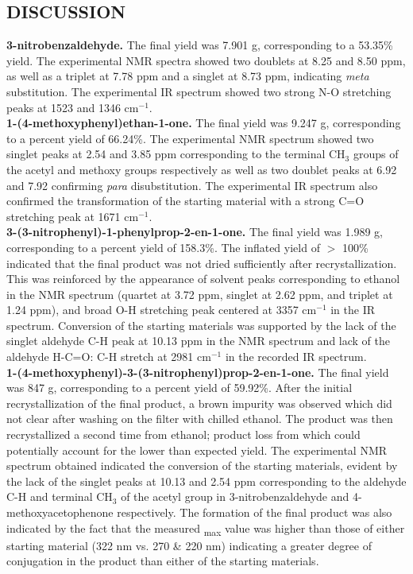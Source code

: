 \documentclass[11pt]{article}
\let\bf\textbf
\begin{document}
\subsection*{DISCUSSION}
\bf{3-nitrobenzaldehyde.} The final yield was 7.901 g, corresponding to a 53.35\% yield. The experimental NMR spectra showed two doublets at 8.25 and 8.50 ppm, as well as a triplet at 7.78 ppm and a singlet at 8.73 ppm, indicating \textit{meta} substitution. The experimental IR spectrum showed two strong N-O stretching peaks at 1523 and 1346 cm$^{-1}$. \vspace{2pt}\\
\bf{1-(4-methoxyphenyl)ethan-1-one.} The final yield was 9.247 g, corresponding to a percent yield of 66.24\%. The experimental NMR spectrum showed two singlet peaks at 2.54 and 3.85 ppm corresponding to the terminal CH$_3$ groups of the acetyl and methoxy groups respectively as well as two doublet peaks at 6.92 and 7.92 confirming \textit{para} disubstitution. The experimental IR spectrum also confirmed the transformation of the starting material with a strong C=O stretching peak at 1671 cm$^{-1}$. \vspace{2pt}\\
\bf{3-(3-nitrophenyl)-1-phenylprop-2-en-1-one.} The final yield was 1.989 g, corresponding to a percent yield of 158.3\%. The inflated yield of $>$ 100\% indicated that the final product was not dried sufficiently after recrystallization. This was reinforced by the appearance of solvent peaks corresponding to ethanol in the NMR spectrum (quartet at 3.72 ppm, singlet at 2.62 ppm, and triplet at 1.24 ppm), and broad O-H stretching peak centered at 3357 cm$^{-1}$ in the IR spectrum. Conversion of the starting materials was supported by the lack of the singlet aldehyde C-H peak at 10.13 ppm in the NMR spectrum and lack of the aldehyde H-C=O: C-H stretch at 2981 cm$^{-1}$ in the recorded IR spectrum. \vspace{2pt}\\
\bf{1-(4-methoxyphenyl)-3-(3-nitrophenyl)prop-2-en-1-one.} The final yield was 847 g, corresponding to a percent yield of 59.92\%. After the initial recrystallization of the final product, a brown impurity was observed which did not clear after washing on the filter with chilled ethanol. The product was then recrystallized a second time from ethanol; product loss from which could potentially account for the lower than expected yield. The experimental NMR spectrum obtained indicated the conversion of the starting materials, evident by the lack of the singlet peaks at 10.13 and 2.54 ppm corresponding to the aldehyde C-H and terminal CH$_3$ of the acetyl group in 3-nitrobenzaldehyde and 4-methoxyacetophenone respectively. The formation of the final product was also indicated by the fact that the measured \textlambda\textsubscript{max} value was higher than those of either starting material (322 nm vs. 270 \& 220 nm) indicating a greater degree of conjugation in the product than either of the starting materials.
\end{document}
